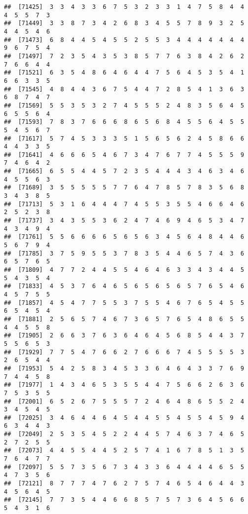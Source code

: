 \documentclass[
]{book}
\begin{document}
\begin{verbatim}
##  [71425]  3  3  4  3  3  6  7  5  3  2  3  3  1  4  7  5  8  4  4  4  5  5  7  3
##  [71449]  3  3  8  7  3  4  2  6  8  3  4  5  5  7  8  9  3  2  5  4  4  5  4  6
##  [71473]  6  8  4  4  5  4  5  5  2  5  5  3  4  4  4  4  4  4  4  9  6  7  5  4
##  [71497]  7  2  3  5  4  3  5  3  8  5  7  7  6  3  8  4  2  6  2  7  6  6  4  4
##  [71521]  6  3  5  4  8  6  4  6  4  4  7  5  6  4  5  3  5  4  1  6  6  3  3  5
##  [71545]  4  8  4  4  3  6  7  5  4  4  7  2  8  5  4  1  3  6  3  6  8  7  4  7
##  [71569]  5  5  3  5  3  2  7  4  5  5  5  2  4  8  3  5  6  4  5  6  5  5  6  4
##  [71593]  7  8  3  7  6  6  6  8  6  5  6  8  4  5  5  6  4  5  5  5  4  5  6  7
##  [71617]  5  7  4  5  3  3  3  5  1  5  6  5  6  2  4  5  8  6  6  4  4  3  3  5
##  [71641]  4  6  6  6  5  4  6  7  3  4  7  6  7  7  4  5  5  5  9  7  4  6  4  2
##  [71665]  6  5  5  4  4  5  7  2  3  5  4  4  4  3  4  6  3  4  6  4  5  5  6  3
##  [71689]  3  5  5  5  5  5  7  7  6  4  7  8  5  7  8  3  5  6  8  3  4  3  8  5
##  [71713]  5  3  1  6  4  4  4  7  4  5  5  3  5  5  4  6  6  4  6  2  5  2  3  8
##  [71737]  3  4  3  5  5  3  6  2  4  7  4  6  9  4  6  5  3  4  7  4  3  4  9  4
##  [71761]  5  5  6  6  6  6  5  6  5  6  3  4  5  6  4  8  4  4  6  5  6  7  9  4
##  [71785]  3  7  5  9  5  5  3  7  8  3  5  4  4  6  5  7  4  3  6  6  5  7  6  5
##  [71809]  4  7  7  2  4  4  5  5  4  6  4  6  3  3  4  3  4  4  5  5  4  3  5  4
##  [71833]  4  5  3  7  6  4  6  5  6  5  6  5  6  5  7  6  5  4  6  4  5  7  5  5
##  [71857]  4  5  4  7  7  5  5  3  7  5  5  4  6  7  6  5  4  5  5  6  5  4  5  4
##  [71881]  2  5  6  5  7  4  6  7  3  6  5  7  6  5  4  8  6  5  5  4  4  5  5  8
##  [71905]  2  6  6  3  7  6  3  6  4  6  4  5  6  8  5  4  4  3  7  5  5  6  5  3
##  [71929]  7  7  5  4  7  6  6  2  7  6  6  6  7  4  5  5  5  5  3  2  6  5  4  4
##  [71953]  5  4  2  5  8  3  4  5  3  3  6  4  6  4  3  3  7  6  9  7  4  4  5  8
##  [71977]  1  4  3  4  6  5  3  5  5  4  4  7  5  6  6  2  6  3  6  7  5  3  5  5
##  [72001]  6  5  2  6  7  5  5  5  7  2  4  6  4  8  6  5  5  2  4  3  4  5  4  5
##  [72025]  3  4  6  4  4  6  4  5  4  4  5  5  4  5  5  4  5  9  4  6  3  4  4  3
##  [72049]  2  5  3  5  4  5  2  2  4  4  5  7  4  6  3  7  4  6  5  2  7  2  5  5
##  [72073]  4  4  5  5  4  4  5  2  5  7  4  1  6  7  8  5  1  3  5  7  6  4  7  7
##  [72097]  5  5  7  3  5  6  7  3  4  3  3  6  4  4  4  4  6  5  5  4  7  3  5  6
##  [72121]  8  7  7  7  4  7  6  2  7  5  7  4  6  5  4  6  4  4  3  4  5  6  4  5
##  [72145]  7  7  3  5  4  4  6  6  8  5  7  5  7  3  6  4  5  6  6  5  4  3  1  6

\end{verbatim}
\end{document}
